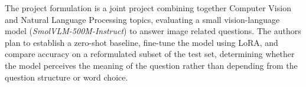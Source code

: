 The project formulation is a joint project combining together Computer Vision and 
Natural Language Processing topics, evaluating a small vision-language model 
(\textit{SmolVLM-500M-Instruct}) to answer image related questions. The authors plan to 
establish a zero-shot baseline, fine-tune the model using LoRA, and compare accuracy on
a reformulated subset of the test set, determining whether the model perceives
the meaning of the question rather than depending from the question structure or word choice. 
